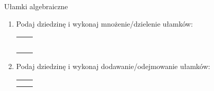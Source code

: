 \documentclass[12pt,a4paper]{article}
\begin{document}
	\begin{center}
		\LARGE Ułamki algebraiczne
	\end{center}
	\vspace{1cm}
	
	
	\begin{enumerate}[1.]
		
		\item Podaj dziedzinę i wykonaj mnożenie/dzielenie ułamków:
		\Large
		\begin{enumerate}[a)] \begin{tabular}{p{7cm} p{7cm}} 
				\item $\frac{3x^2-3}{x^2-4x-5} \cdot \frac{7x-35}{2x-2}=$& \vspace{0.4cm} \item $\frac{5x^2+7x+2}{x^2+2x+1}\cdot\frac{3x^2+2x-1}{25x^2-4}= $ \\
				\item $\frac{2x^2+6x}{x^2+4x+4}:\frac{x^2+6x+9}{x^2-4}= $& \item $\frac{x^3-5x^2+2x-10}{x^2+x-30}:\frac{x^3+2x}{x+6}= $ \\
				\item $\frac{x^2-1}{x^2+x-6}\cdot\frac{x^2+7x+12}{x^2+x-2}= $& \item $\frac{5x^2+7x+2}{x^2+2x+1}\cdot\frac{3x^2+2x-1}{25x^2-4}= $ \\
				\item $\frac{x^3+3x^2-x-3}{x^2-1}\cdot\frac{1}{x^2+8x+15}= $& \item $\frac{2x^3+6x^2+x+3}{4x^2+11x-3}\cdot\frac{3x^2+2x-1}{2x^3+2x^2+x+1}= $ \\
				\item $\frac{25x^2-10x+1}{x^2-9}:\frac{10x-2}{5x+15}= $& \item $\frac{x^3-5x^2+2x-10}{x^2+x-30}:\frac{x^3+2x}{x+6}= $ \\
		\end{tabular} \end{enumerate}
		\normalsize
		\item Podaj dziedzinę i wykonaj dodawanie/odejmowanie ułamków:
		\Large
		\begin{enumerate}[a)] \begin{tabular}{p{7cm} p{7cm}} 
				\item $\frac{x+1}{x-5}+\frac{2}{x+1}= $& \vspace{0.4cm} \item $\frac{x-1}{x^2+x-2}+\frac{x+5}{x^2-x-6}= $ \\
				\item $\frac{2x+4}{x+1}-\frac{2x}{x-8}= $& \item $\frac{x-1}{x^2-2x-15}-\frac{-2x-3}{x^2-x-20}= $ \\

\end{tabular}
\end{enumerate}
\end{enumerate}
\end{document}
